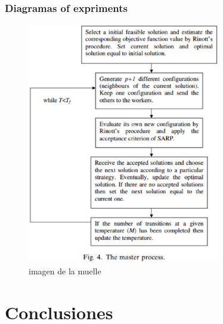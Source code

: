 \documentclass{beamer}
\begin{document}
\begin{frame}
\frametitle{Diagramas of expriments }
\begin{figure}[!th]
\begin{center}
\includegraphics[width=0.75\textwidth]{img/master_p.eps}
\caption{imagen de la muelle}
\label{fig:1}
\end{center}
\end{figure}
\end{frame}
\section{Conclusiones}
\end{document}
